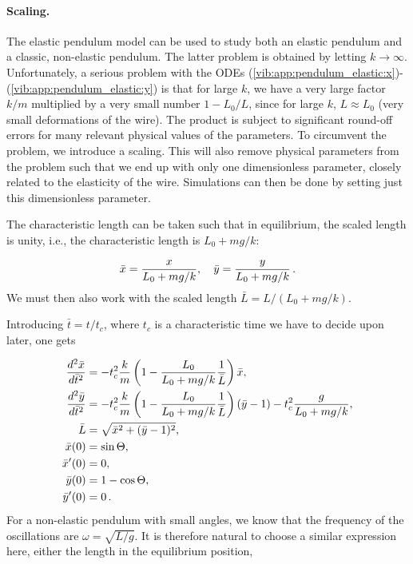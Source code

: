 \documentclass[%
oneside,                 %
final,                   %
10pt]{article}
\begin{document}
\paragraph{Scaling.}
The elastic pendulum model can be used to study both an elastic pendulum
and a classic, non-elastic pendulum. The latter problem is obtained
by letting $k\rightarrow\infty$. Unfortunately,
a serious problem with the ODEs
(\ref{vib:app:pendulum_elastic:x})-(\ref{vib:app:pendulum_elastic:y}) is that for large $k$, we have a very large factor $k/m$ multiplied by a
very small number $1-L_0/L$, since for large $k$, $L\approx L_0$ (very
small deformations of the wire). The product is subject to
significant round-off errors for many relevant physical values of
the parameters. To circumvent the problem, we introduce a scaling. This
will also remove physical parameters from the problem such that we end
up with only one dimensionless parameter,
closely related to the elasticity of the wire. Simulations can then be
done by setting just this dimensionless parameter.

The characteristic length can be taken such that in equilibrium, the
scaled length is unity, i.e., the characteristic length is $L_0+mg/k$:

\[ \bar x = \frac{x}{L_0+mg/k},\quad \bar y = \frac{y}{L_0+mg/k}\tp\]
We must then also work with the scaled length $\bar L = L/(L_0+mg/k)$.

Introducing $\bar t=t/t_c$, where $t_c$ is a characteristic time we
have to decide upon later, one gets

\begin{align*}
\frac{d^2\bar x}{d\bar t^2} &=
-t_c^2\frac{k}{m}\left(1 -\frac{L_0}{L_0+mg/k}\frac{1}{\bar L}\right)\bar x,\\ 
\frac{d^2\bar y}{d\bar t^2} &=
-t_c^2\frac{k}{m}\left(1 -\frac{L_0}{L_0+mg/k}\frac{1}{\bar L}\right)(\bar y-1)
-t_c^2\frac{g}{L_0 + mg/k},\\ 
\bar L &= \sqrt{\bar x^2 + (\bar y-1)^2},\\ 
\bar x(0) &= \sin\Theta,\\ 
\bar x'(0) &= 0,\\ 
\bar y(0) & = 1 - \cos\Theta,\\ 
\bar y'(0) &= 0\tp
\end{align*}
For a non-elastic pendulum with small angles, we know that the
frequency of the oscillations are $\omega = \sqrt{L/g}$. It is therefore
natural to choose a similar expression here, either the length in
the equilibrium position,
\end{document}

